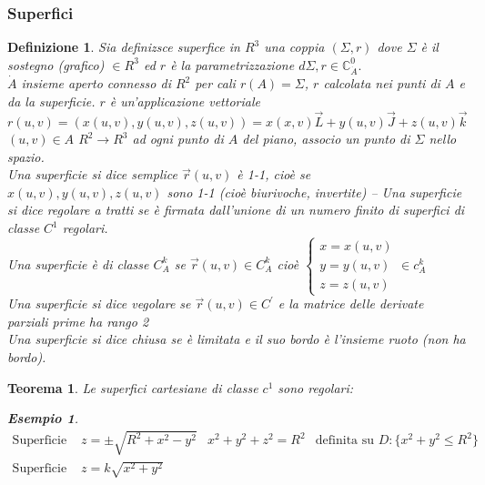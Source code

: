 \documentclass{book}
\newtheorem{teorema}{Teorema}
\newtheorem{defi}{Definizione}
\newtheorem{esempio}{Esempio}
\begin{document}
\subsubsection{Superfici}
\begin{defi}
Sia definizsce {\color{red}superfice} in $R^3$ una coppia $(\Sigma, r)$ dove
$\Sigma$ è il sostegno (grafico) $\in R^3$ ed $r$ è la parametrizzazione 
$d\Sigma, r\in\mathds{C}^0_{\dot{A}}.$\\
	$\dot{A}$ insieme aperto connesso di $R^2$ per cali $r(A)=\Sigma$, $r$
	calcolata nei punti di $A$ e da la superficie. $r$ è un'applicazione
	vettoriale
	$r(u,v)=(x(u,v),y(u,v),z(u,v))=x(x,v)\vec{L}+y(u,v)\vec{J}+z(u,v)\vec{k}$
	$(u,v)\in A$ $R^2\to R^3$ ad ogni punto di $A$ del piano, associo un punto
	di $\Sigma$ nello spazio.\\
	Una superficie si dice {\color{red}semplice} $\vec{r}(u,v)$ è 1-1, cioè se
	$x(u,v),y(u,v),z(u,v)$ sono 1-1 (cioè biurivoche, invertite) -- Una
	superficie si dice {\color{red}regolare a tratti} se è firmata dall'unione
	di un numero finito di superfici di classe $C^1$ regolari.\\
	Una superficie è di classe $C^k_A$ se $\vec{r}(u,v)\in C_A^k$ cioè
	$\begin{cases}
		x=x(u,v)\\
		y=y(u,v)\\
		z=z(u,v)
	\end{cases} \in c_A^k$\\
	Una superficie si dice {\color{red}vegolare} se $\vec{r}(u,v)\in C^\prime$
	e la matrice delle derivate parziali prime ha rango 2\\
	Una superficie si dice {\color{red}chiusa} se è limitata e il suo bordo è
	l'insieme ruoto (non ha bordo).
\end{defi}
\begin{teorema}
	Le superfici cartesiane di classe $c^1$ sono regolari:
	\begin{esempio}
		\begin{equation*}
			\begin{matrix}
				\text{Superficie sferica: } &z=\pm\sqrt{R^2+x^2-y^2}&
				x^2+y^2+z^2=R^2 & \text{definita su } D:\{x^2+y^2\leq R^2\}\\
				\text{Superficie corta: } & z=k\sqrt{x^2+y^2}
			\end{matrix}
		\end{equation*}
	\end{esempio}
\end{teorema}
\end{document}

